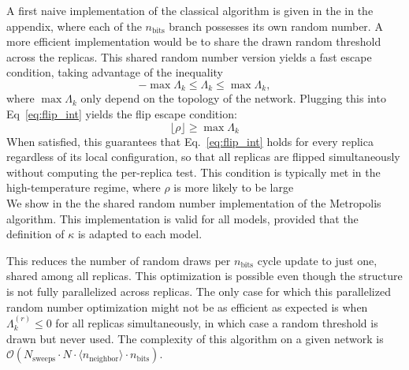 A first naive implementation of the classical algorithm is given in the  in the appendix, where each of the $n_\text{bits}$ branch possesses its own random number. A more efficient implementation would be to share the drawn random threshold across the replicas. This shared random number version yields a fast escape condition, taking advantage of the inequality
\begin{equation*}
 -\max\Lambda_k \leq \Lambda_k \leq \max\Lambda_k ,
\end{equation*}
where $\max\Lambda_k $ only depend on the topology of the network.
Plugging this into Eq~\eqref{eq:flip_int} yields the flip escape condition:
\begin{equation}
 \lfloor \rho \rfloor \geq \max\Lambda_k
 \label{eq:flip_escape_condition}
\end{equation}
When satisfied, this guarantees that Eq.~\eqref{eq:flip_int} holds for every replica regardless of its local configuration, so that all replicas are flipped simultaneously without computing the per-replica test. This condition is typically met in the high-temperature regime, where $\rho$ is more likely to be large\\
We show in the  the shared random number implementation of the Metropolis algorithm. This implementation is valid for all models, provided that the definition of $\kappa$ is adapted to each model.\\
\vspace{1em}
\begin{algorithm}[H]
\DontPrintSemicolon
\caption{Standard Metropolis implementation}
\BlankLine
\BlankLine
{}
\label{alg:ising_classic}
\end{algorithm}
\vspace{1em}
This reduces the number of random draws per $n_\text{bits}$ cycle update to just one, shared among all replicas. This optimization is possible even though the structure is not fully parallelized across replicas. The only case for which this parallelized random number optimization might not be as efficient as expected is when $\Lambda_k^{(r)} \leq 0$  for all replicas simultaneously, in which case a random threshold is drawn but never used.
The complexity of this algorithm on a given network is $\mathcal{O}\left(N_\text{sweeps}\cdot N \cdot \langle n_\text{neighbor} \rangle \cdot n_\text{bits} \right)$.
